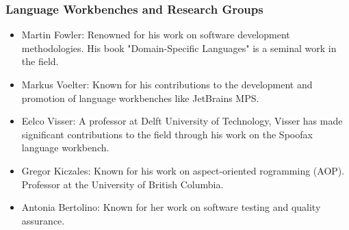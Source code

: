 \documentclass[9pt,xcolor=table,svgnames]{beamer}
\begin{document}
\begin{frame}
    \frametitle{Language Workbenches and Research Groups}

    \begin{itemize}[itemsep=10pt]
        \item \normalsize Martin Fowler: \scriptsize Renowned for his work on software development methodologies. His book "Domain-Specific Languages" is a seminal work in the field.
        \item \normalsize Markus Voelter: \scriptsize Known for his contributions to the development and promotion of language workbenches like JetBrains MPS.
        \item \normalsize Eelco Visser: \scriptsize A professor at Delft University of Technology, Visser has made significant contributions to the field through his work on the Spoofax language workbench.
        \item \normalsize Gregor Kiczales: \scriptsize Known for his work on aspect-oriented rogramming (AOP). Professor at the University of British Columbia.
        \item \normalsize Antonia Bertolino: \scriptsize Known for her work on software testing and quality assurance.
    \end{itemize}
\end{frame}

\endgroup
\end{document}
